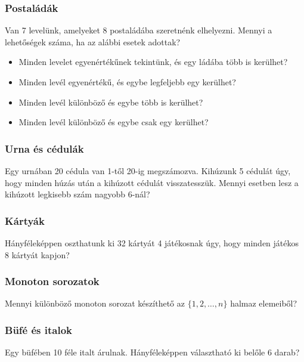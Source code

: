 \documentclass[a4paper]{article}
\begin{document}
\subsubsection{Postaládák}

Van 7 levelünk, amelyeket 8 postaládába szeretnénk elhelyezni. Mennyi a lehetőségek száma, ha az alábbi esetek adottak?
\begin{itemize}
\item Minden levelet egyenértékűnek tekintünk, és egy ládába több is kerülhet?
\item Minden levél egyenértékű, és egybe legfeljebb egy kerülhet?
\item Minden levél különböző és egybe több is kerülhet?
\item Minden levél különböző és egybe csak egy kerülhet?
\end{itemize}

\subsubsection{Urna és cédulák}

Egy urnában 20 cédula van 1-től 20-ig megszámozva.
Kihúzunk 5 cédulát úgy, hogy minden húzás után a kihúzott cédulát visszatesszük.
Mennyi esetben lesz a kihúzott legkisebb szám nagyobb 6-nál?

\subsubsection{Kártyák}

Hányféleképpen oszthatunk ki 32 kártyát 4 játékosnak úgy, hogy minden játékos 8 kártyát kapjon?

\subsubsection{Monoton sorozatok}

Mennyi különböző monoton sorozat készíthető az $\{1, 2, \ldots, n\}$ halmaz elemeiből?

\subsubsection{Büfé és italok}

Egy büfében 10 féle italt árulnak. Hányféleképpen választható ki belőle 6 darab?
\end{document}
